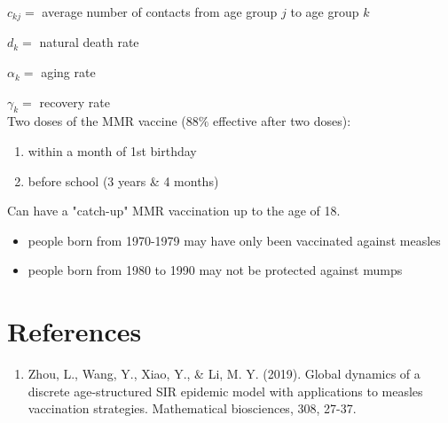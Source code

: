 \documentclass[a4paper, 12pt]{article}
\begin{document}
$c_{kj}=$ average number of contacts from age group $j$ to age group
$k$

$d_{k}=$ natural death rate

$\alpha_{k}=$ aging rate

$\gamma_{k}=$ recovery rate\\

\newpage
Two doses of the MMR vaccine ($88\%$ effective after two doses):
\begin{enumerate}
\item within a month of 1st birthday
\item before school (3 years \& 4 months)
\end{enumerate}
Can have a "catch-up" MMR vaccination up to the age of 18.
\begin{itemize}
\item people born from 1970-1979 may have only been vaccinated against measles
\item people born from 1980 to 1990 may not be protected against mumps
\end{itemize}

\section*{References}
\begin{enumerate}
\item Zhou, L., Wang, Y., Xiao, Y., \& Li, M. Y. (2019). Global dynamics of a discrete age-structured SIR epidemic model with applications to measles vaccination strategies. Mathematical biosciences, 308, 27-37.
\end{enumerate}
\end{document}
